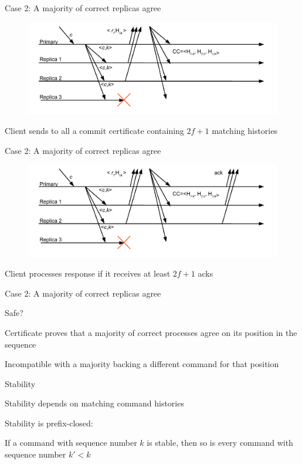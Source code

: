 \begin{frame}{Case 2: A majority of correct replicas agree}

\begin{figure}
	\includegraphics[width=\textwidth]{messages9}	
\end{figure}

Client sends to all a \alert{commit certificate} containing $2f+1$ matching histories

\end{frame}

\begin{frame}{Case 2: A majority of correct replicas agree}

\begin{figure}
	\includegraphics[width=\textwidth]{messages10}	
\end{figure}

Client processes response if it receives at least $2f +1$ acks

\end{frame}

\begin{frame}{Case 2: A majority of correct replicas agree}
	
Safe?
\BIL
\item Certificate proves that a majority of correct processes agree on its position in the sequence
\item Incompatible with a majority backing a different command for that position
\EIL

\bigskip
Stability
\BIL
\item Stability depends on matching command histories 
\item Stability is \alert{prefix-closed}:
	\BI
	\item If a command with sequence number $k$ is stable, then so is every command with sequence number $k' < k$
	\EI
\EIL
\end{frame}

